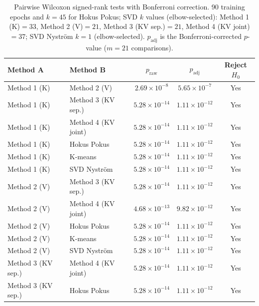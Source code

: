 \begin{table}[H]
\centering
\caption{Pairwise Wilcoxon signed-rank tests with Bonferroni correction.
90 training epochs and $k=45$ for Hokus Pokus; SVD $k$ values (elbow-selected):
Method 1 (K)$=33$, Method 2 (V)$=21$, Method 3 (KV sep.)$=21$, Method 4 (KV joint)$=37$;
SVD Nyström $k=1$ (elbow-selected). $p_\text{adj}$ is the Bonferroni-corrected
$p$-value ($m=21$ comparisons).}
\label{tab:stat_tests_k_low}
\begin{tabular}{ll cc c}
\toprule
Method A & Method B & $p_\text{raw}$ & $p_\text{adj}$ & Reject $H_0$ \\
\midrule
Method 1 (K)       & Method 2 (V)         & $2.69 \times 10^{-8}$  & $5.65 \times 10^{-7}$  & Yes \\
Method 1 (K)       & Method 3 (KV sep.)   & $5.28 \times 10^{-14}$ & $1.11 \times 10^{-12}$ & Yes \\
Method 1 (K)       & Method 4 (KV joint)  & $5.28 \times 10^{-14}$ & $1.11 \times 10^{-12}$ & Yes \\
Method 1 (K)       & Hokus Pokus          & $5.28 \times 10^{-14}$ & $1.11 \times 10^{-12}$ & Yes \\
Method 1 (K)       & K-means              & $5.28 \times 10^{-14}$ & $1.11 \times 10^{-12}$ & Yes \\
Method 1 (K)       & SVD Nyström          & $5.28 \times 10^{-14}$ & $1.11 \times 10^{-12}$ & Yes \\
\addlinespace
Method 2 (V)       & Method 3 (KV sep.)   & $5.28 \times 10^{-14}$ & $1.11 \times 10^{-12}$ & Yes \\
Method 2 (V)       & Method 4 (KV joint)  & $4.68 \times 10^{-13}$ & $9.82 \times 10^{-12}$ & Yes \\
Method 2 (V)       & Hokus Pokus          & $5.28 \times 10^{-14}$ & $1.11 \times 10^{-12}$ & Yes \\
Method 2 (V)       & K-means              & $5.28 \times 10^{-14}$ & $1.11 \times 10^{-12}$ & Yes \\
Method 2 (V)       & SVD Nyström          & $5.28 \times 10^{-14}$ & $1.11 \times 10^{-12}$ & Yes \\
\addlinespace
Method 3 (KV sep.) & Method 4 (KV joint)  & $5.28 \times 10^{-14}$ & $1.11 \times 10^{-12}$ & Yes \\
Method 3 (KV sep.) & Hokus Pokus          & $5.28 \times 10^{-14}$ & $1.11 \times 10^{-12}$ & Yes \\

\end{tabular}
\end{table}
